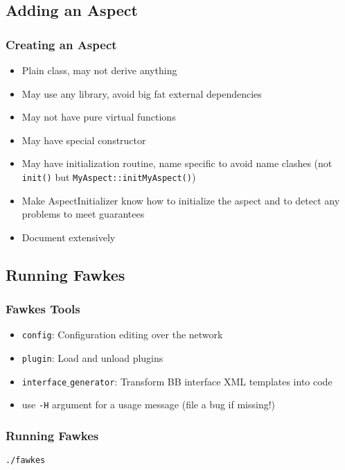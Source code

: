 \subsection{Adding an Aspect}
\begin{frame}
  \frametitle{Creating an Aspect}
  \begin{itemize}
  \item Plain class, may not derive anything
  \item May use any library, avoid big fat external dependencies
  \item May not have pure virtual functions
  \item May have special constructor
  \item May have initialization routine, name specific to avoid name clashes
    (not \texttt{init()} but \texttt{MyAspect::initMyAspect()})
  \item Make AspectInitializer know how to initialize the aspect and to detect
    any problems to meet guarantees
  \item Document extensively
  \end{itemize}
\end{frame}

\subsection{Running Fawkes}
\begin{frame}
  \frametitle{Fawkes Tools}
  \begin{itemize}
  \item \texttt{config}: Configuration editing over the network
  \item \texttt{plugin}: Load and unload plugins
  \item \texttt{interface$\_$generator}: Transform BB interface XML templates into code
  \item use \texttt{-H} argument for a usage message (file a bug if missing!)
  \end{itemize}
\end{frame}

\begin{frame}
  \frametitle{Running Fawkes}
  \begin{center}
    \texttt{./fawkes}
  \end{center}
\end{frame}


